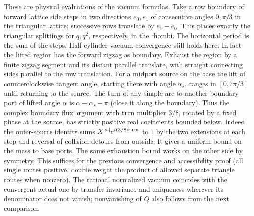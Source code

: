 \documentclass[11pt]{article}
\numberwithin{equation}{section}
\theoremstyle{definition}\newtheorem{definition}[theorem]{Definition}
\theoremstyle{remark}\newtheorem{remark}[theorem]{Remark}
\begin{document}
These are physical evaluations of the vacuum formulas. Take a row boundary of forward lattice side steps in two directions \(e_0,e_1\) of consecutive angles \(0,\pi/3\) in the triangular lattice; successive rows translate by \(e_1-e_0\). This places exactly the triangular splittings for \(q,q^2\), respectively, in the rhombi. The horizontal period is the sum of the steps. Half-cylinder vacuum convergence still holds here. In fact the lifted region has the forward zigzag as boundary. Exhaust the region by a finite zigzag segment and its distant parallel translate, with straight connecting sides parallel to the row translation. For a midport source on the base the lift of counterclockwise tangent angle, starting there with angle \(\alpha_s\), ranges in \([0,7\pi/3]\) until returning to the source. The turn of any simple arc to another boundary port of lifted angle \(\alpha\) is \(\alpha-\alpha_s-\pi\) (close it along the boundary). Thus the complex boundary flux argument with turn multiplier \(3/8\), rotated by a fixed phase at the source, has strictly positive real coefficients bounded below. Indeed the outer-source identity sums \(X^{|\omega|}e^{i(3/8){\rm turn}}\) to 1 by the two extensions at each step and reversal of collision detours from outside. It gives a uniform bound on the mass to base ports. The same exhaustion bound works on the other side by symmetry. This suffices for the previous convergence and accessibility proof (all single routes positive, double weight the product of allowed separate triangle routes when nonzero). The rational normalized vacuum coincides with the convergent actual one by transfer invariance and uniqueness wherever its denominator does not vanish; nonvanishing of \(Q\) also follows from the next comparison.
\end{document}
